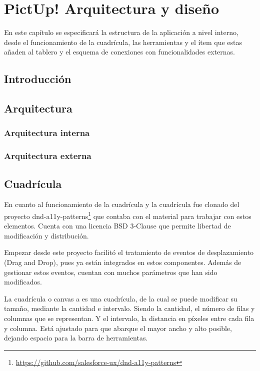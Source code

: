 \chapter{PictUp! Arquitectura y diseño}
\label{cap:arquitectura}



\begin{resumen} 
 En este capítulo se especificará la estructura de la aplicación a nivel interno, desde el funcionamiento de la cuadrícula, las herramientas y el ítem que estas añaden al tablero y el esquema de conexiones con funcionalidades externas. 
\end{resumen}

\section{Introducción}

\section{Arquitectura}
\subsection{Arquitectura interna}
\subsection{Arquitectura externa}

\section{Cuadrícula}

En cuanto al funcionamiento de la cuadrícula y la cuadrícula fue clonado del proyecto dnd-a11y-patterns\footnote{\url{https://github.com/salesforce-ux/dnd-a11y-patterns}} que contaba con el material para trabajar con estos elementos. Cuenta con una licencia BSD 3-Clause que permite libertad de modificación y distribución. 

Empezar desde este proyecto facilitó el  tratamiento de eventos de desplazamiento (Drag and Drop),  pues ya están integrados en estos componentes. Además de gestionar estos eventos, cuentan con muchos parámetros que han sido modificados. 

La cuadrícula o canvas a es una cuadrícula, de la cual se puede modificar su tamaño, mediante la cantidad e intervalo. Siendo la cantidad, el número de filas y columnas que se representan. Y el intervalo, la distancia en píxeles entre cada fila y columna. Está ajustado para que abarque el mayor ancho y alto posible, dejando espacio para la barra de herramientas. 

